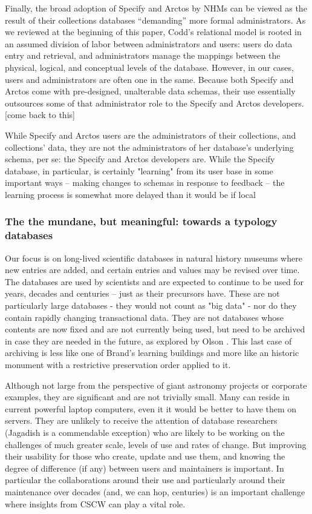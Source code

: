 Finally, the broad adoption of Specify and Arctos by NHMs can be viewed as the result of their collections databases “demanding” more formal administrators. As we reviewed at the beginning of this paper, Codd’s relational model is rooted in an assumed division of labor between administrators and users: users do data entry and retrieval, and administrators manage the mappings between the physical, logical, and conceptual levels of the database. However, in our cases, users and administrators are often one in the same. Because both Specify and Arctos come with pre-designed, unalterable data schemas, their use essentially outsources some of that administrator role to the Specify and Arctos developers.  [come back to this]

While Specify and Arctos users are the administrators of their collections, and collections’ data, they are not the administrators of her database's underlying schema, per se: the Specify and Arctos developers are.  While the Specify database, in particular, is certainly "learning" from its user base in some important ways – making changes to schemas in response to feedback – the learning process is somewhat more delayed than it would be if local 


\subsubsection{The the mundane, but meaningful: towards a typology databases}

Our focus is on long-lived scientific databases in natural history museums where new entries are added, and certain entries and values may be revised over time. The databases are used by scientists and are expected to continue to be used for years, decades and centuries – just as their precursors have. These are not particularly large databases - they would not count as "big data" - nor do they contain rapidly changing transactional data. They are not databases whose contents are now fixed and are not currently being used, but need to be archived in case they are  needed in the future, as explored by Olson \cite{olson2010database}. This last case of archiving is less like one of Brand’s learning buildings and more like an historic monument with a restrictive preservation order applied to it.

Although not large from the perspective of giant astronomy projects or corporate examples, they are  significant and are not trivially small. Many can reside in current powerful laptop computers, even it it would be better to have them on servers. They are unlikely to receive the attention of database researchers (Jagadish is a commendable exception) who are likely to be working on the challenges of much greater scale, levels of use and rates of change. But improving their usability for those who create, update and use them, and knowing the degree of difference (if any) between users and maintainers is important. In particular the collaborations around their use and particularly around their maintenance over decades (and, we can hop, centuries) is an important challenge where insights from CSCW can play a vital role.

